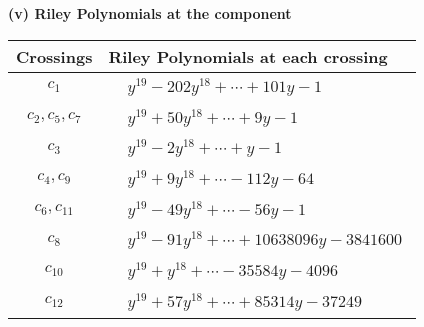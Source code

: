\documentclass[1p]{elsarticle_modified}
\theoremstyle{definition}
\begin{document}
\newpage\renewcommand{\arraystretch}{1}
\flushleft \textbf{(v) Riley Polynomials at the component}\newline \\
\begin{tabular}{m{50pt}|m{274pt}}
Crossings & \hspace{64pt}Riley Polynomials at each crossing \\
\hline $$\begin{aligned}c_{1}\end{aligned}$$&$\begin{aligned}
&y^{19}-202 y^{18}+\cdots+101 y-1
\end{aligned}$\\
\hline $$\begin{aligned}c_{2},c_{5},c_{7}\end{aligned}$$&$\begin{aligned}
&y^{19}+50 y^{18}+\cdots+9 y-1
\end{aligned}$\\
\hline $$\begin{aligned}c_{3}\end{aligned}$$&$\begin{aligned}
&y^{19}-2 y^{18}+\cdots+y-1
\end{aligned}$\\
\hline $$\begin{aligned}c_{4},c_{9}\end{aligned}$$&$\begin{aligned}
&y^{19}+9 y^{18}+\cdots-112 y-64
\end{aligned}$\\
\hline $$\begin{aligned}c_{6},c_{11}\end{aligned}$$&$\begin{aligned}
&y^{19}-49 y^{18}+\cdots-56 y-1
\end{aligned}$\\
\hline $$\begin{aligned}c_{8}\end{aligned}$$&$\begin{aligned}
&y^{19}-91 y^{18}+\cdots+10638096 y-3841600
\end{aligned}$\\
\hline $$\begin{aligned}c_{10}\end{aligned}$$&$\begin{aligned}
&y^{19}+y^{18}+\cdots-35584 y-4096
\end{aligned}$\\
\hline $$\begin{aligned}c_{12}\end{aligned}$$&$\begin{aligned}
&y^{19}+57 y^{18}+\cdots+85314 y-37249
\end{aligned}$\\
\hline
\end{tabular}\\~\\
\end{document}
